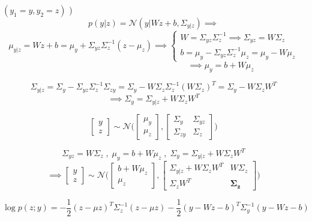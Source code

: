 \raggedright {}
$
({y_1} = {y} , {y_2} = {z})
$
)
\[
p({y|z}) = \mathcal{N}({y|Wz+b, \Sigma_{y|z}}) \implies
\]
\[
{\mu_{y|z}} = {Wz+b} =
{\mu_y + \Sigma_{yz}\Sigma_{z}^{-1}}({z-\mu_z}) \implies 
\begin{cases*}
  {W} = {\Sigma_{yz} \Sigma_z^{-1}} \implies {\Sigma_{yz}} = {W\Sigma_z}\\
  {b} = {\mu_y-\Sigma_{yz} \Sigma_z^{-1}\mu_z} = {\mu_y-W\mu_z}
\end{cases*} 
\]
\[
\qquad\qquad\qquad\qquad\qquad\qquad\qquad\qquad \implies {\mu_y} = {b+W\mu_z}
\]

\[
{\Sigma_{y|z}} = {\Sigma_y - \Sigma_{yz}\Sigma_{z}^{-1}\Sigma_{zy}} = {\Sigma_y - W\Sigma_{z}\Sigma_{z}^{-1}(W\Sigma_{z})^T} = {\Sigma_y - W\Sigma_{z}W^T} 
\]
\[
\implies {\Sigma_y} = {\Sigma_{y|z} + W\Sigma_{z}W^T}
\]
\raggedright {}
\[
\begin{bmatrix}
  {y}\\
  {z}
\end{bmatrix} \sim \mathcal{N}\Big( 
\begin{bmatrix}
  {\mu_y}\\
  {\mu_z}
\end{bmatrix} , 
\begin{bmatrix}
  {\Sigma_{y}}&{\Sigma_{yz}}\\
  {\Sigma_{zy}}&\Sigma_{z}
\end{bmatrix}
\Big)
\]
\raggedright {}
\begin{equation}
{\Sigma_{yz}} = {W\Sigma_z} \;, \; {\mu_y} = {b+W\mu_z} \;, \; {\Sigma_y} = {\Sigma_{y|z} + W\Sigma_{z}W^T} \label{eq1}
\end{equation}
\[ \implies
\begin{bmatrix}
  {y}\\
  {z}
\end{bmatrix} \sim \mathcal{N}\Big( 
\begin{bmatrix}
  {b+W\mu_z}\\
  {\mu_z}
\end{bmatrix} , 
\begin{bmatrix}
  {\Sigma_{y|z} + W\Sigma_{z}W^T}&{W\Sigma_z}\\
  {\Sigma_zW^T}&\boldsymbol{\Sigma_{z}}
\end{bmatrix}
\Big)
\]

\raggedright {}
\begin{equation}
\log p(z; y) = -\frac{1}{2}(z - \mu{z})^T \Sigma_z^{-1}(z - \mu{z}) - \frac{1}{2}(y - Wz - b)^T \Sigma_y^{-1}(y - Wz - b) 
\end{equation}

